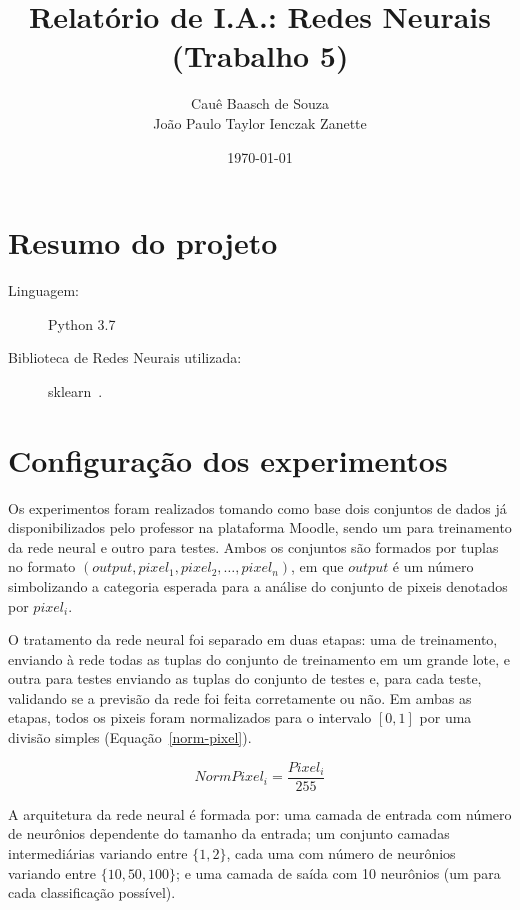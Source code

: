 \documentclass[twocolumn]{article}
\title{Relatório de I.A.: Redes Neurais (Trabalho 5)}
\author{Cauê Baasch de Souza \\
        João Paulo Taylor Ienczak Zanette}
\date{\today}
\newcommand{\hiddenlayers}{1, 2}
\newcommand{\hiddenneurons}{10, 50, 100}
\begin{document}
    \maketitle{}

    \section{Resumo do projeto}

    \begin{description}
        \item [Linguagem:] Python 3.7
        \item [Biblioteca de Redes Neurais utilizada:] sklearn~\cite{sklearn}.
    \end{description}

    \section{Configuração dos experimentos}

    Os experimentos foram realizados tomando como base dois conjuntos de dados
    já disponibilizados pelo professor na plataforma Moodle, sendo um para
    treinamento da rede neural e outro para testes. Ambos os conjuntos são
    formados por tuplas no formato $(output, pixel_1, pixel_2, \ldots,
    pixel_n)$, em que $output$ é um número simbolizando a categoria esperada
    para a análise do conjunto de pixeis denotados por $pixel_{i}$.

    O tratamento da rede neural foi separado em duas etapas: uma de
    treinamento, enviando à rede todas as tuplas do conjunto de treinamento em
    um grande lote, e outra para testes enviando as tuplas do conjunto de
    testes e, para cada teste, validando se a previsão da rede foi feita
    corretamente ou não. Em ambas as etapas, todos os pixeis foram normalizados
    para o intervalo $[0, 1]$ por uma divisão simples
    (Equação~\ref{norm-pixel}).

    \begin{equation}
        \label{norm-pixel}
        NormPixel_i = \frac{Pixel_i}{255}
    \end{equation}

    A arquitetura da rede neural é formada por: uma camada de entrada com
    número de neurônios dependente do tamanho da entrada; um conjunto camadas
    intermediárias variando entre $\{\hiddenlayers{}\}$, cada uma com número de
    neurônios variando entre $\{\hiddenneurons{}\}$; e uma camada de saída com
    10 neurônios (um para cada classificação possível).
\end{document}
